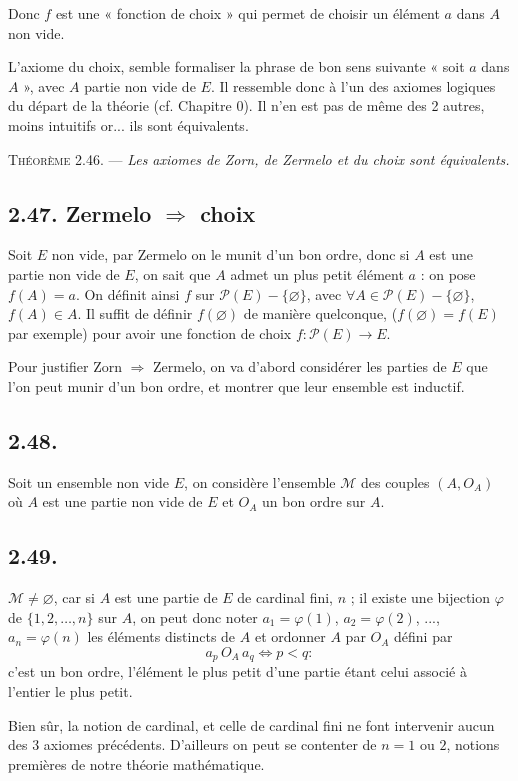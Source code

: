 Donc $f$ est une « fonction de choix » qui permet de choisir un élément $a$ dans $A$ non vide.

L'axiome du choix, semble formaliser la phrase de bon sens suivante « soit $a$ dans $A$ », avec $A$ partie non vide de $E$. Il ressemble donc à l'un des axiomes logiques du départ de la théorie (cf. Chapitre 0). Il n'en est pas de même des 2 autres, moins intuitifs or... ils sont équivalents.

\medskip\noindent\textsc{Théorème 2.46.} --- \emph{Les axiomes de Zorn, de Zermelo et du choix sont équivalents.}

\subsection*{2.47. Zermelo $\Rightarrow$ choix}
Soit $E$ non vide, par Zermelo on le munit d'un bon ordre, donc si $A$ est une partie non vide de $E$, on sait que $A$ admet un plus petit élément $a$ : on pose $f(A)=a$. On définit ainsi $f$ sur $\mathcal P(E)-\{\varnothing\}$, avec $\forall A\in\mathcal P(E)-\{\varnothing\}$, $f(A)\in A$. Il suffit de définir $f(\varnothing)$ de manière quelconque, ($f(\varnothing)=f(E)$ par exemple) pour avoir une fonction de choix $f:\mathcal P(E)\to E$. \bookend

Pour justifier Zorn $\Rightarrow$ Zermelo, on va d'abord considérer les parties de $E$ que l'on peut munir d'un bon ordre, et montrer que leur ensemble est inductif.

\subsection*{2.48.}
Soit un ensemble non vide $E$, on considère l'ensemble $\mathcal M$ des couples $(A,O_A)$ où $A$ est une partie non vide de $E$ et $O_A$ un bon ordre sur $A$.

\subsection*{2.49.}
$\mathcal M\ne\varnothing$, car si $A$ est une partie de $E$ de cardinal fini, $n$ ; il existe une bijection $\varphi$ de $\{1,2,\ldots,n\}$ sur $A$, on peut donc noter $a_1=\varphi(1)$, $a_2=\varphi(2)$, ..., $a_n=\varphi(n)$ les éléments distincts de $A$ et ordonner $A$ par $O_A$ défini par
\[
a_p\,O_A\,a_q\Leftrightarrow p<q :
\]
c'est un bon ordre, l'élément le plus petit d'une partie étant celui associé à l'entier le plus petit. \bookend

Bien sûr, la notion de cardinal, et celle de cardinal fini ne font intervenir aucun des 3 axiomes précédents. D'ailleurs on peut se contenter de $n=1$ ou $2$, notions premières de notre théorie mathématique.

